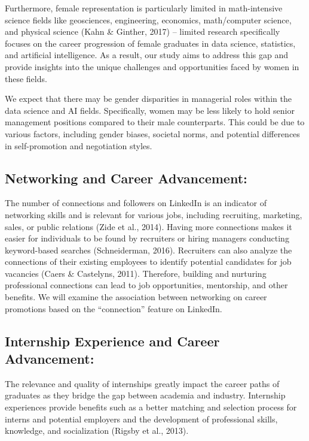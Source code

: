 \documentclass[11pt,]{article}
\begin{document}
Furthermore, female representation is particularly limited in
math-intensive science fields like geosciences, engineering, economics,
math/computer science, and physical science (Kahn \& Ginther, 2017) --
limited research specifically focuses on the career progression of
female graduates in data science, statistics, and artificial
intelligence. As a result, our study aims to address this gap and
provide insights into the unique challenges and opportunities faced by
women in these fields.

We expect that there may be gender disparities in managerial roles
within the data science and AI fields. Specifically, women may be less
likely to hold senior management positions compared to their male
counterparts. This could be due to various factors, including gender
biases, societal norms, and potential differences in self-promotion and
negotiation styles.

\hypertarget{networking-and-career-advancement}{%
\subsection{Networking and Career
Advancement:}\label{networking-and-career-advancement}}

The number of connections and followers on LinkedIn is an indicator of
networking skills and is relevant for various jobs, including
recruiting, marketing, sales, or public relations (Zide et al., 2014).
Having more connections makes it easier for individuals to be found by
recruiters or hiring managers conducting keyword-based searches
(Schneiderman, 2016). Recruiters can also analyze the connections of
their existing employees to identify potential candidates for job
vacancies (Caers \& Castelyns, 2011). Therefore, building and nurturing
professional connections can lead to job opportunities, mentorship, and
other benefits. We will examine the association between networking on
career promotions based on the ``connection'' feature on LinkedIn.

\hypertarget{internship-experience-and-career-advancement}{%
\subsection{Internship Experience and Career
Advancement:}\label{internship-experience-and-career-advancement}}

The relevance and quality of internships greatly impact the career paths
of graduates as they bridge the gap between academia and industry.
Internship experiences provide benefits such as a better matching and
selection process for interns and potential employers and the
development of professional skills, knowledge, and socialization (Rigsby
et al., 2013).
\end{document}

